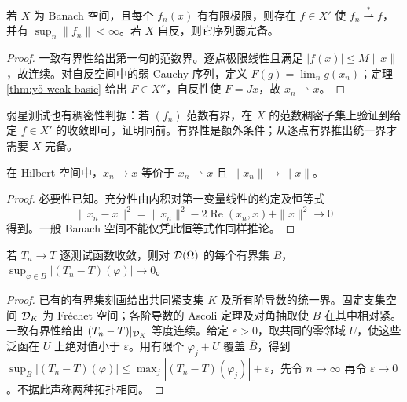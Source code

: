 \begin{proposition}[弱星极限与序列弱完备性]
若 $X$ 为 Banach 空间，且每个 $f_n(x)$ 有有限极限，则存在 $f\in X'$ 使 $f_n\overset{*}{\rightharpoonup}f$，并有 $\sup_n\|f_n\|<\infty$。若 $X$ 自反，则它序列弱完备。
\end{proposition}
\begin{proof}
一致有界性给出第一句的范数界。逐点极限线性且满足 $|f(x)|\le M\|x\|$，故连续。对自反空间中的弱 Cauchy 序列，定义 $F(g)=\lim_ng(x_n)$；定理 \ref{thm:y5-weak-basic} 给出 $F\in X''$，自反性使 $F=Jx$，故 $x_n\rightharpoonup x$。
\end{proof}

弱星测试也有稠密性判据：若 $(f_n)$ 范数有界，在 $X$ 的范数稠密子集上验证到给定 $f\in X'$ 的收敛即可，证明同前。有界性是额外条件；从逐点有界推出统一界才需要 $X$ 完备。

\begin{proposition}
在 Hilbert 空间中，$x_n\to x$ 等价于 $x_n\rightharpoonup x$ 且 $\|x_n\|\to\|x\|$。
\end{proposition}
\begin{proof}
必要性已知。充分性由内积对第一变量线性的约定及恒等式
\[
 \|x_n-x\|^2=\|x_n\|^2-2\operatorname{Re}(x_n,x)+\|x\|^2\longrightarrow0
\]
得到。一般 Banach 空间不能仅凭此恒等式作同样推论。
\end{proof}

\begin{proposition}[分布序列的弱星与强对偶收敛]
若 $T_n\to T$ 逐测试函数收敛，则对 $\mathcal{D}(\Omega)$ 的每个有界集 $B$，$\sup_{\varphi\in B}|(T_n-T)(\varphi)|\to0$。
\end{proposition}
\begin{proof}
已有的有界集刻画给出共同紧支集 $K$ 及所有阶导数的统一界。固定支集空间 $\mathcal{D}_K$ 为 Fr\'echet 空间；各阶导数的 Ascoli 定理及对角抽取使 $B$ 在其中相对紧。一致有界性给出 $(T_n-T)|_{\mathcal{D}_K}$ 等度连续。给定 $\varepsilon>0$，取共同的零邻域 $U$，使这些泛函在 $U$ 上绝对值小于 $\varepsilon$。用有限个 $\varphi_j+U$ 覆盖 $\overline B$，得到
$\sup_B|(T_n-T)(\varphi)|\le\max_j|(T_n-T)(\varphi_j)|+\varepsilon$，先令 $n\to\infty$ 再令 $\varepsilon\to0$。不据此声称两种拓扑相同。
\end{proof}

